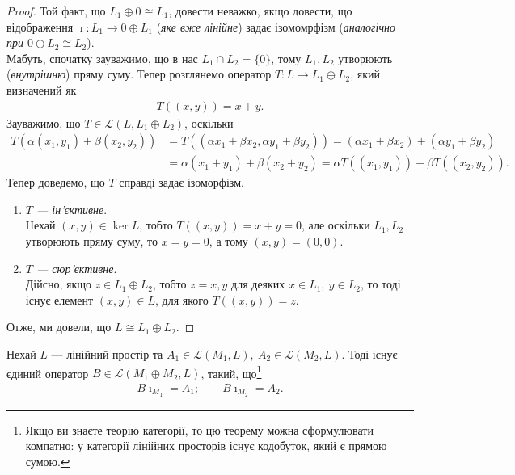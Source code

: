 \documentclass{math_library}
\begin{document}
	\begin{proof}
	Той факт, що $L_1 \oplus 0 \cong L_1$, довести неважко, якщо довести, що відображення $\imath \colon L_1 \to 0 \oplus L_1$ (\textit{яке вже лінійне}) задає ізомомрфізм (\textit{аналогічно при $0 \oplus L_2 \cong L_2$}).
	\bigskip \\
	Мабуть, спочатку зауважимо, що в нас $L_1 \cap L_2 = \{0\}$, тому $L_1,L_2$ утворюють (\textit{внутрішню}) пряму суму. Тепер розглянемо оператор $T \colon L \to L_1 \oplus L_2$, який визначений як
	\begin{align*}
	T((x,y)) = x+y.
	\end{align*}
	Зауважимо, що $T \in \mathcal{L}(L, L_1 \oplus L_2)$, оскільки
	\begin{align*}
	T(\alpha (x_1,y_1) + \beta (x_2,y_2)) & = T((\alpha x_1 + \beta x_2, \alpha y_1 + \beta y_2))  = (\alpha x_1 + \beta x_2) + (\alpha y_1 + \beta y_2) \\
	& = \alpha (x_1 + y_1) + \beta (x_2 + y_2) = \alpha T((x_1,y_1)) + \beta T((x_2,y_2)).
\end{align*}
	Тепер доведемо, що $T$ справді задає ізоморфізм.
	\begin{enumerate}[wide=0pt,label={\Roman*.}]
	\item \textit{$T$ --- ін'єктивне}.\\
	Нехай $(x,y) \in \ker L$, тобто $T((x,y)) = x+y = 0$, але оскільки $L_1,L_2$ утворюють пряму суму, то $x = y = 0$, а тому $(x,y) = (0,0)$.
	
	\item \textit{$T$ --- сюр'єктивне}.\\
	Дійсно, якщо $z \in L_1 \oplus L_2$, тобто $z = x,y$ для деяких $x \in L_1,\ y \in L_2$, то тоді існує елемент $(x,y) \in L$, для якого $T((x,y)) = z$.
	\end{enumerate}
	Отже, ми довели, що $L \cong L_1 \oplus L_2$.
	\end{proof}
	
	\begin{theorem}
	Нехай $L$ --- лінійний простір та $A_1 \in \mathcal{L}(M_1,L),\ A_2 \in \mathcal{L}(M_2,L)$. Тоді існує єдиний оператор $B \in \mathcal{L}(M_1 \oplus M_2, L)$, такий, що\footnote{Якщо ви знаєте теорію категорії, то цю теорему можна сформулювати компатно: у категорії лінійних просторів існує кодобуток, який є прямою сумою.}
	\begin{align*}
	B \imath_{M_1} = A_1; \qquad B \imath_{M_2} = A_2.
	\end{align*}
	\begin{figure}[H]
	\centering
	\end{figure}
	\end{theorem}
	
\end{document}
